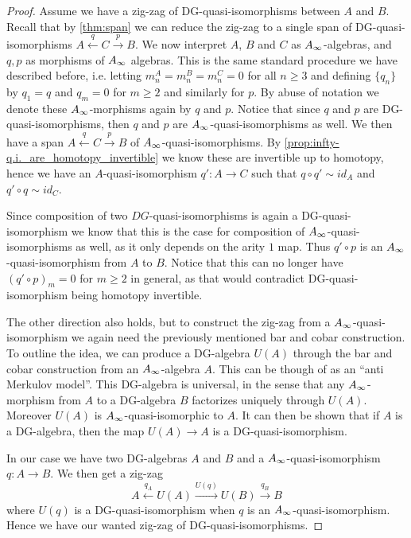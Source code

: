 \begin{proof}
Assume we have a zig-zag of DG-quasi-isomorphisms between $A$ and $B$. Recall that by \cref{thm:span} we can reduce the zig-zag to a single span of DG-quasi-isomorphisms $A\overset{q}\longleftarrow C\overset{p}\longrightarrow B$. We now interpret $A$, $B$ and $C$ as $A_{\infty}$-algebras, and $q, p$ as morphisms of $A_{\infty}$ algebras. This is the same standard procedure we have described before, i.e. letting $m^A_n = m^B_n = m^C_n = 0$ for all $n\geq 3$ and defining $\{q_n\}$ by $q_1 = q$ and $q_m = 0$ for $m\geq 2$ and similarly for $p$. By abuse of notation we denote these $A_{\infty}$-morphisms again by $q$ and $p$. Notice that since $q$ and $p$ are DG-quasi-isomorphisms, then $q$ and $p$ are $A_{\infty}$-quasi-isomorphisms as well. We then have a span $A\overset{q}\longleftarrow C \overset{p}\longrightarrow B$ of $A_{\infty}$-quasi-isomorphisms. By \cref{prop:infty-q.i._are_homotopy_invertible} we know these are invertible up to homotopy, hence we have an $A$-quasi-isomorphism $q'\colon A\longrightarrow C$ such that $q\circ q' \sim id_A$ and $q'\circ q \sim id_C$. 

Since composition of two $DG$-quasi-isomorphisms is again a DG-quasi-isomorphism we know that this is the case for composition of $A_{\infty}$-quasi-isomorphisms as well, as it only depends on the arity $1$ map. Thus $q'\circ p$ is an $A_{\infty}$-quasi-isomorphism from $A$ to $B$. Notice that this can no longer have $(q'\circ p)_m = 0$ for $m\geq 2$ in general, as that would contradict DG-quasi-isomorphism being homotopy invertible. 

The other direction also holds, but to construct the zig-zag from a $A_{\infty}$-quasi-isomorphism we again need the previously mentioned bar and cobar construction. To outline the idea, we can produce a DG-algebra $U(A)$ through the bar and cobar construction from an $A_{\infty}$-algebra $A$. This can be though of as an ``anti Merkulov model''. This DG-algebra is universal, in the sense that any $A_{\infty}$-morphism from $A$ to a DG-algebra $B$ factorizes uniquely through $U(A)$. Moreover $U(A)$ is $A_{\infty}$-quasi-isomorphic to $A$. It can then be shown that if $A$ is a DG-algebra, then the map $U(A)\longrightarrow A$ is a DG-quasi-isomorphism. 

In our case we have two DG-algebras $A$ and $B$ and a $A_{\infty}$-quasi-isomorphism $q\colon A\longrightarrow B$. We then get a zig-zag
\begin{equation*}
    A\overset{q_A}\longleftarrow U(A) \overset{U(q)}\longrightarrow U(B)\overset{q_B}\longrightarrow B
\end{equation*}
where $U(q)$ is a DG-quasi-isomorphism when $q$ is an $A_{\infty}$-quasi-isomorphism. Hence we have our wanted zig-zag of DG-quasi-isomorphisms. 
\end{proof}

